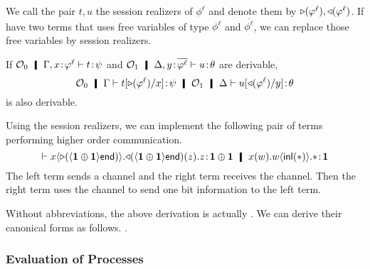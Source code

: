       We call the pair $t,u$ the session realizers of $\phi^\ell$ and
      denote them by $\mathop\triangleright(\varphi^\ell), \mathop\triangleleft(\varphi^\ell)$.
      If have two terms that uses free variables of type $\phi^\ell$ and
      $\overline{\phi^\ell}$,
      we can replace those free variables by session realizers.
       \begin{corollary}
	If
	$\hypert_0\hmid \G,\tj{x}{\phi^\ell}\tr\tj{t}{\psi}$ and
	$\hypert_1\hmid \D,\tj{y}{\overline{\phi^\ell}}\tr\tj{u}{\theta}$
	are derivable,
	\[
	\hypert_0\hmid \G\tr\tj{t[\leftside{\phi^\ell}/ x]}{\psi}
	\hmid \hypert_1\hmid \D\tr\tj{u[\rightside{\phi^\ell}/ y]}{\theta}
	\]
	is also derivable.
       \end{corollary}
	\begin{example}
	 Using the session realizers, we can implement the following
	 pair of terms performing higher order communication.
	 \[
	 \tr
	 \tj{
	 \sendterm x {\leftside{\sendtype{\one \oplus \one}\terminate}}
	 {\recvterm {\rightside{\sendtype{\one\oplus\one}\terminate}} z
	 z}}
	 {\one\oplus\one}
	 \hmid
	 \tj{
	 \recvterm x w {\sendterm w {\inl \ast} \ast}}
	 {\one}
	 \]
	 The left term sends a channel and the right term receives the
	 channel.  Then the right term uses the channel to send one bit
	 information to the left term.

	 Without abbreviations, the above derivation is actually
	 .
	 We can derive their canonical forms as follows.
	 .
	\end{example}


      \subsubsection{Evaluation of Processes}

